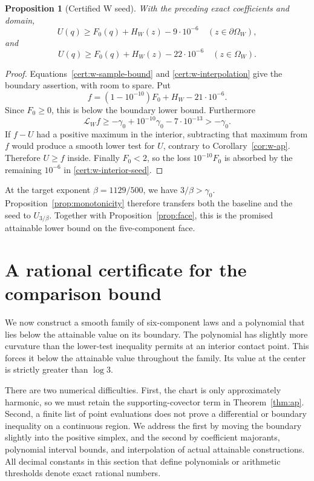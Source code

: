 \documentclass[11pt]{article}
\numberwithin{equation}{section}
\newtheorem{proposition}[theorem]{Proposition}
\theoremstyle{definition}
\theoremstyle{remark}
\begin{document}
\begin{proposition}[Certified W seed]
\label{cert:w-seed}
With the preceding exact coefficients and domain,
\[
 U(q)\ge F_0(q)+H_W(z)-9\cdot10^{-6}\quad (z\in\partial\Omega_W),
\]
and
\begin{equation}
 U(q)\ge F_0(q)+H_W(z)-22\cdot10^{-6}\quad (z\in\Omega_W).
 \label{cert:w-interior-seed}
\end{equation}
\end{proposition}
\begin{proof}
Equations~\eqref{cert:w-sample-bound} and
\eqref{cert:w-interpolation} give the boundary assertion, with room
to spare.  Put
\[
 f=(1-10^{-10})F_0+H_W-21\cdot10^{-6}.
\]
Since $F_0\ge0$, this is below the boundary lower bound.  Furthermore
\[
 \mathcal L_W f\ge-\gamma _0+10^{-10}\gamma _0-7\cdot10^{-13}
                      >-\gamma _0.
\]
If $f-U$ had a positive maximum in the interior, subtracting that
maximum from $f$ would produce a smooth lower test for $U$, contrary
to Corollary~\ref{cor:w-ap}.  Therefore $U\ge f$ inside.  Finally
$F_0<2$, so the loss $10^{-10}F_0$ is absorbed by the remaining
$10^{-6}$ in \eqref{cert:w-interior-seed}.
\end{proof}

At the target exponent $\beta=1129/500$, we have
$3/\beta>\gamma _0$.  Proposition~\ref{prop:monotonicity} therefore
transfers both the baseline and the seed to $U_{3/\beta}$.
Together with Proposition~\ref{prop:face}, this is the promised
attainable lower bound on the five-component face.

\section{A rational certificate for the comparison bound}
\label{cert:section}

We now construct a smooth family of six-component laws and a polynomial
that lies below the attainable value on its boundary.  The polynomial has
slightly more curvature than the lower-test inequality permits at an interior
contact point.  This forces it below the attainable value throughout the
family.  Its value at the center is strictly greater than $\log 3$.

There are two numerical difficulties.  First, the chart is only approximately
harmonic, so we must retain the supporting-covector term in
Theorem~\ref{thm:ap}.  Second, a finite list of point evaluations does not
prove a differential or boundary inequality on a continuous region.  We
address the first by moving the boundary slightly into the positive simplex,
and the second by coefficient majorants, polynomial interval bounds, and
interpolation of actual attainable constructions.  All decimal constants
in this section that define polynomials or arithmetic thresholds denote exact
rational numbers.
\end{document}
